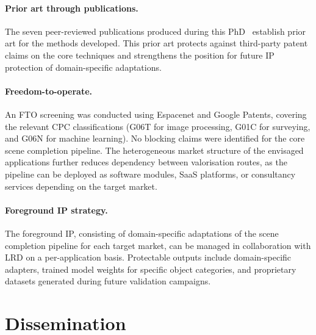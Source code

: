 \paragraph{Prior art through publications.} The seven peer-reviewed publications produced during this PhD~\cite{vermandere_two-step_2022, vermandere_texture-based_2023, vermandere_semantic_2024, vermandere_geometry_2025, vermandere_guided_2025, vermandere_synthetic_2026, geyter_point_2022} establish prior art for the methods developed. This prior art protects against third-party patent claims on the core techniques and strengthens the position for future IP protection of domain-specific adaptations.

\paragraph{Freedom-to-operate.} An FTO screening was conducted using Espacenet and Google Patents, covering the relevant CPC classifications (G06T for image processing, G01C for surveying, and G06N for machine learning). No blocking claims were identified for the core scene completion pipeline. The heterogeneous market structure of the envisaged applications further reduces dependency between valorisation routes, as the pipeline can be deployed as software modules, SaaS platforms, or consultancy services depending on the target market.

\paragraph{Foreground IP strategy.} The foreground IP, consisting of domain-specific adaptations of the scene completion pipeline for each target market, can be managed in collaboration with LRD on a per-application basis. Protectable outputs include domain-specific adapters, trained model weights for specific object categories, and proprietary datasets generated during future validation campaigns.


\section{Dissemination}
\label{sec:val_dissemination}

